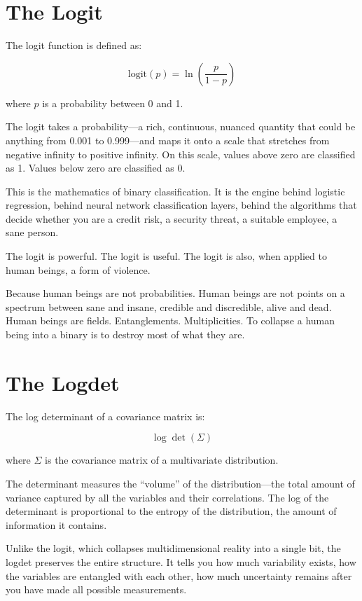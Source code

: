 \documentclass[11pt,openany]{book}
\begin{document}
\section*{The Logit}

The logit function is defined as:

\[
\text{logit}(p) = \ln\left(\frac{p}{1-p}\right)
\]

where \(p\) is a probability between 0 and 1.

The logit takes a probability---a rich, continuous, nuanced quantity that could be anything from 0.001 to 0.999---and maps it onto a scale that stretches from negative infinity to positive infinity. On this scale, values above zero are classified as 1. Values below zero are classified as 0.

This is the mathematics of binary classification. It is the engine behind logistic regression, behind neural network classification layers, behind the algorithms that decide whether you are a credit risk, a security threat, a suitable employee, a sane person.

The logit is powerful. The logit is useful. The logit is also, when applied to human beings, a form of violence.

Because human beings are not probabilities. Human beings are not points on a spectrum between sane and insane, credible and discredible, alive and dead. Human beings are fields. Entanglements. Multiplicities. To collapse a human being into a binary is to destroy most of what they are.

\section*{The Logdet}

The log determinant of a covariance matrix is:

\[
\log\det(\Sigma)
\]

where \(\Sigma\) is the covariance matrix of a multivariate distribution.

The determinant measures the ``volume'' of the distribution---the total amount of variance captured by all the variables and their correlations. The log of the determinant is proportional to the entropy of the distribution, the amount of information it contains.

Unlike the logit, which collapses multidimensional reality into a single bit, the logdet preserves the entire structure. It tells you how much variability exists, how the variables are entangled with each other, how much uncertainty remains after you have made all possible measurements.
\end{document}
